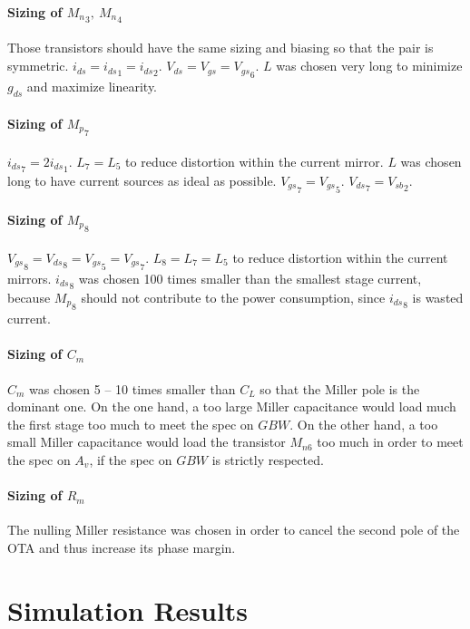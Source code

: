 \documentclass[english,10pt]{article}
\begin{document}
\paragraph{Sizing of ${M_{n}}_3, \:{M_{n}}_4$}
Those transistors should have the same sizing and biasing so that the pair is symmetric.
${i_{ds}} = {i_{ds}}_1 = {i_{ds}}_2$.
${V_{ds}} = {V_{gs}} = {V_{gs}}_6$.
$L$ was chosen very long to minimize $g_{ds}$ and maximize linearity.

\paragraph{Sizing of ${M_{p}}_7$}
${i_{ds}}_7 = 2 {i_{ds}}_1$.
$L_7 = L_5$ to reduce distortion within the current mirror. $L$ was chosen long to have current sources as ideal as possible.
${V_{gs}}_7 = {V_{gs}}_5$.
${V_{ds}}_7 = {V_{sb}}_2$.

\paragraph{Sizing of ${M_{p}}_8$}
${V_{gs}}_8 = {V_{ds}}_8 = {V_{gs}}_5 = {V_{gs}}_7$.
$L_8 = L_7 = L_5$ to reduce distortion within the current mirrors.
${i_{ds}}_8$ was chosen 100 times smaller than the smallest stage current, because ${M_{p}}_8$ should not contribute to the power consumption, since ${i_{ds}}_8$ is wasted current.

\paragraph{Sizing of $C_{m}$}
$C_{m}$ was chosen 5 -- 10 times smaller than $C_L$ so that the Miller pole is the dominant one. On the one hand, a too large Miller capacitance would load much the first stage too much to meet the spec on $GBW$. On the other hand, a too small Miller capacitance would load the transistor $M_{n6}$ too much in order to meet the spec on $A_v$, if the spec on $GBW$ is strictly respected.

\paragraph{Sizing of $R_{m}$}
The nulling Miller resistance was chosen in order to cancel the second pole of the OTA and thus increase its phase margin.

\section{Simulation Results}
\end{document}

